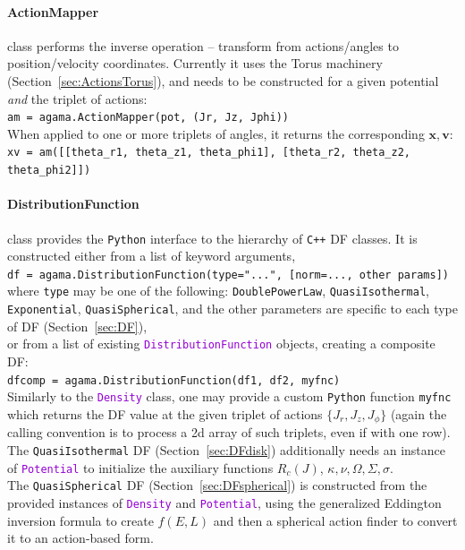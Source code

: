 \documentclass[12pt]{article}
\newcommand{\Cpp}  {\texttt{C++}\xspace}
\newcommand{\Python}{\texttt{Python}\xspace}
\newcommand{\ttt}[1]{\textcolor{darkviolet}{\texttt{#1}}}
\newcommand{\ppp}[1]{\textcolor{darkolive} {\texttt{#1}}}
\newcommand{\bv}{\boldsymbol{v}}
\newcommand{\bx}{\boldsymbol{x}}
\begin{document}
\paragraph{ActionMapper} class performs the inverse operation -- transform from actions/angles to position/velocity coordinates. Currently it uses the Torus machinery (Section~\ref{sec:ActionsTorus}), and needs to be constructed for a given potential \textit{and} the triplet of actions:\\
\texttt{am = agama.ActionMapper(pot, (Jr, Jz, Jphi))}\\
When applied to one or more triplets of angles, it returns the corresponding $\bx,\bv$:\\
\texttt{xv = am([[theta_r1, theta_z1, theta_phi1], [theta_r2, theta_z2, theta_phi2]])}

\paragraph{DistributionFunction} class provides the \Python interface to the hierarchy of \Cpp DF classes. It is constructed either from a list of keyword arguments,\\
\texttt{df = agama.DistributionFunction(type="...", [norm=..., other params])}\\
where \ppp{type} may be one of the following: \ppp{DoublePowerLaw}, \ppp{QuasiIsothermal}, \ppp{Exponential}, \ppp{QuasiSpherical}, and the other parameters are specific to each type of DF (Section~\ref{sec:DF}), \\
or from a list of existing \ttt{DistributionFunction} objects, creating a composite DF:\\
\texttt{dfcomp = agama.DistributionFunction(df1, df2, myfnc)}\\[2mm]
Similarly to the \ttt{Density} class, one may provide a custom \Python function \texttt{myfnc} which returns the DF value at the given triplet of actions $\{J_r,J_z,J_\phi\}$ (again the calling convention is to process a 2d array of such triplets, even if with one row).\\[2mm]
The \ppp{QuasiIsothermal} DF (Section~\ref{sec:DFdisk}) additionally needs an instance of \ttt{Potential} to initialize the auxiliary functions $R_c(J)$, $\kappa,\nu,\Omega,\Sigma,\sigma$.\\[2mm]
The \ppp{QuasiSpherical} DF (Section~\ref{sec:DFspherical}) is constructed from the provided instances of \ttt{Density} and \ttt{Potential}, using the generalized Eddington inversion formula to create $f(E,L)$ and then a spherical action finder to convert it to an action-based form.
\end{document}
